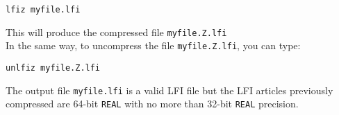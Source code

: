 \begin{verbatim}
lfiz myfile.lfi
\end{verbatim}

\noindent This will produce the compressed file \texttt{myfile.Z.lfi}\\


\noindent In the same way, to uncompress the file \texttt{myfile.Z.lfi}, you can
type:
\begin{verbatim}
unlfiz myfile.Z.lfi
\end{verbatim}

\noindent The output file \texttt{myfile.lfi} is a valid LFI file but the LFI
articles previously compressed are 64-bit \texttt{REAL} with no more than 32-bit
\texttt{REAL} precision.




